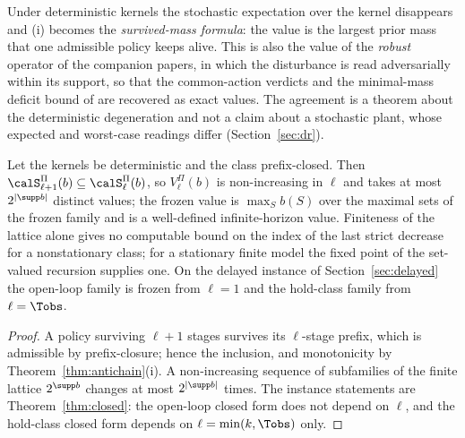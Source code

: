 \begin{remark}\label{rem:operators}
Under deterministic kernels the stochastic expectation over the kernel disappears and (i) becomes the \emph{survived-mass formula}: the value is the largest prior mass that one admissible policy keeps alive. This is also the value of the \emph{robust} operator of the companion papers, in which the disturbance is read adversarially within its support, so that the common-action verdicts and the minimal-mass deficit bound of \cite{Abaee2026calc} are recovered as exact values. The agreement is a theorem about the deterministic degeneration and not a claim about a stochastic plant, whose expected and worst-case readings differ (Section~\ref{sec:dr}).
\end{remark}

\begin{proposition}\label{prop:freeze}
Let the kernels be deterministic and the class prefix-closed. Then $\calS^{\Pi}_{\ell+1}(b)\subseteq\calS^{\Pi}_{\ell}(b)$, so $V^{\Pi}_\ell(b)$ is non-increasing in $\ell$ and takes at most $2^{|\supp b|}$ distinct values; the frozen value is $\max_S b(S)$ over the maximal sets of the frozen family and is a well-defined infinite-horizon value. Finiteness of the lattice alone gives no computable bound on the index of the last strict decrease for a nonstationary class; for a stationary finite model the fixed point of the set-valued recursion supplies one. On the delayed instance of Section~\ref{sec:delayed} the open-loop family is frozen from $\ell=1$ and the hold-class family from $\ell=\Tobs$.
\end{proposition}

\begin{proof}
A policy surviving $\ell+1$ stages survives its $\ell$-stage prefix, which is admissible by prefix-closure; hence the inclusion, and monotonicity by Theorem~\ref{thm:antichain}(i). A non-increasing sequence of subfamilies of the finite lattice $2^{\supp b}$ changes at most $2^{|\supp b|}$ times. The instance statements are Theorem~\ref{thm:closed}: the open-loop closed form does not depend on $\ell$, and the hold-class closed form depends on $\ell=\min(k,\Tobs)$ only.
\end{proof}
